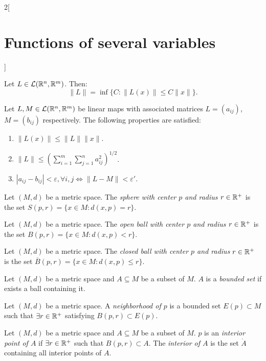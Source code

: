 \documentclass[../../../main.tex]{subfiles}
\begin{document}
\begin{multicols}{2}[\section{Functions of several variables}]
\begin{prop}
        Let $L\in\mathcal{L}(\mathbb{R}^n,\mathbb{R}^m)$. Then: $$\|L\|=\inf\{C:\|L(x)\|\leq C\|x\|\}.$$
    \end{prop}
    \begin{corollary}
        Let $L,M\in\mathcal{L}(\mathbb{R}^n,\mathbb{R}^m)$ be linear maps with associated matrices $L=(a_{ij})$, $M=(b_{ij})$ respectively. The following properties are satisfied:
        \begin{enumerate}
            \item $\|L(x)\|\leq\|L\|\|x\|$.
            \item $\displaystyle\|L\|\leq\left(\sum_{i=1}^m\sum_{j=1}^na_{ij}^2\right)^{1/2}$.
            \item $|a_{ij}-b_{ij}|<\varepsilon,\forall i,j\iff\|L-M\|<\varepsilon'$.
        \end{enumerate}
    \end{corollary}
    \begin{definition}
        Let $(M,d)$ be a metric space. The \textit{sphere with center $p$ and radius $r\in\mathbb{R}^+$} is the set $S(p,r)=\{x\in M:d(x,p)=r\}$.
    \end{definition}
    \begin{definition}
        Let $(M,d)$ be a metric space. The \textit{open ball with center $p$ and radius $r\in\mathbb{R}^+$} is the set $B(p,r)=\{x\in M:d(x,p)<r\}$.
    \end{definition}
    \begin{definition}
        Let $(M,d)$ be a metric space. The \textit{closed ball with center $p$ and radius $r\in\mathbb{R}^+$} is the set $\overline{B}(p,r)=\{x\in M:d(x,p)\leq r\}$.
    \end{definition}
    \begin{definition}
        Let $(M,d)$ be a metric space and $A\subseteq M$ be a subset of $M$. $A$ is a \textit{bounded set} if exists a ball containing it.
    \end{definition}
    \begin{definition}
        Let $(M,d)$ be a metric space. A \textit{neighborhood of $p$} is a bounded set $E(p)\subset M$ such that $\exists r\in\mathbb{R}^+$ satisfying $B(p,r)\subset E(p)$.
    \end{definition}
    \begin{definition}
        Let $(M,d)$ be a metric space and $A\subseteq M$ be a subset of $M$. $p$ is an \textit{interior point of $A$} if $\exists r\in\mathbb{R}^+$ such that $B(p,r)\subset A$. The \textit{interior of $A$} is the set $\mathring A$ containing all interior points of $A$.
    \end{definition}

\end{multicols}
\end{document}
